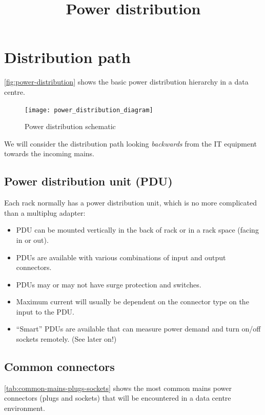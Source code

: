\documentclass{pgnotes}
\title{Power distribution}
\begin{document}
\maketitle

\section{Distribution path}

\autoref{fig:power-distribution} shows the basic power distribution hierarchy in a data centre.

\begin{figure}[htbp]
  \centering
  \texttt{[image: power\_distribution\_diagram]}
  \caption{Power distribution schematic}
  \label{fig:power-distribution}
\end{figure}

We will consider the distribution path looking \textit{backwards} from the IT equipment towards the incoming mains.


\subsection{Power distribution unit (PDU)}

Each rack normally has a power distribution unit, which is no more complicated than a multiplug adapter:
\begin{itemize}
\item PDU can be mounted vertically in the back of rack or in a rack space (facing in or out).
\item PDUs are available with various combinations of input and output connectors.
\item PDUs may or may not have surge protection and switches.
\item Maximum current will usually be dependent on the connector type on the input to the PDU.
\item ``Smart'' PDUs are available that can measure power demand and turn on/off sockets remotely. (See later on!)
\end{itemize}

\newpage
\subsection{Common connectors}

\autoref{tab:common-mains-plugs-sockets} shows the most common mains power connectors (plugs and sockets) that will be encountered in a data centre environment.
\end{document}
